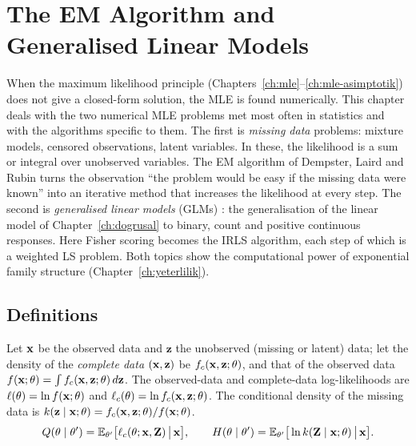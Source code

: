 \documentclass[main.tex]{subfiles}
\begin{document}
\chapter{The EM Algorithm and Generalised Linear Models}\label{ch:em-glm}

When the maximum likelihood principle (Chapters~\ref{ch:mle}--\ref{ch:mle-asimptotik}) does not give a closed-form solution, the MLE is found numerically. This chapter deals with the two numerical MLE problems met most often in statistics and with the algorithms specific to them. The first is \emph{missing data} problems: mixture models, censored observations, latent variables. In these, the likelihood is a sum or integral over unobserved variables. The EM algorithm of Dempster, Laird and Rubin \cite{dempster77} turns the observation ``the problem would be easy if the missing data were known'' into an iterative method that increases the likelihood at every step. The second is \emph{generalised linear models} (GLMs) \cite{nelder-wedderburn72}: the generalisation of the linear model of Chapter~\ref{ch:dogrusal} to binary, count and positive continuous responses. Here Fisher scoring becomes the IRLS algorithm, each step of which is a weighted LS problem. Both topics show the computational power of exponential family structure (Chapter~\ref{ch:yeterlilik}).

\section{Definitions}

\begin{definition}\label{def:em}
Let $\mathbf{x}$ be the observed data and $\mathbf z$ the unobserved (missing or latent) data; let the density of the \emph{complete data} $(\mathbf{x},\mathbf z)$ be $f_c(\mathbf{x},\mathbf z;\theta)$, and that of the observed data $f(\mathbf{x};\theta)=\int f_c(\mathbf{x},\mathbf z;\theta)\,d\mathbf z$. The observed-data and complete-data log-likelihoods are $\ell(\theta)=\ln f(\mathbf{x};\theta)$ and $\ell_c(\theta)=\ln f_c(\mathbf{x},\mathbf z;\theta)$. The conditional density of the missing data is $k(\mathbf z\mid\mathbf{x};\theta)=f_c(\mathbf{x},\mathbf z;\theta)/f(\mathbf{x};\theta)$.
\[
Q(\theta\mid\theta')=\mathbb{E}_{\theta'}\big[\ell_c(\theta;\mathbf{x},\mathbf Z)\,\big|\,\mathbf{x}\big],\qquad H(\theta\mid\theta')=\mathbb{E}_{\theta'}\big[\ln k(\mathbf Z\mid\mathbf{x};\theta)\,\big|\,\mathbf{x}\big].
\]
\end{definition}
\end{document}
